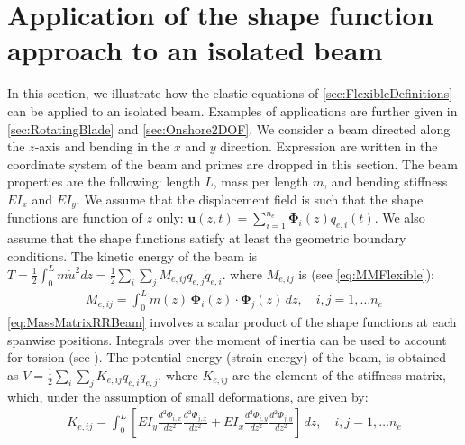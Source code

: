 \documentclass[wes, manuscript]{copernicus}
\renewcommand{\v}[1]{\boldsymbol{#1}}
\begin{document}
\section{Application of the shape function approach to an isolated beam}
\label{sec:ShapeFunctionApproachBeam}
In this section, we illustrate how the elastic equations of \autoref{sec:FlexibleDefinitions} can be applied to an isolated beam. 
Examples of applications are further given in \autoref{sec:RotatingBlade} and \autoref{sec:Onshore2DOF}.
We consider a beam directed along the $z$-axis and bending in the $x$ and $y$ direction. Expression are written in the coordinate system of the beam and primes are dropped in this section.
The beam properties are the following: length $L$, mass per length $m$, and bending stiffness $EI_x$ and $EI_y$.
We assume that the displacement field is such that the shape functions are function of $z$ only:
  $  \v{u}(z,t) = \sum_{i=1}^{n_e} \v{\Phi}_i(z) q_{e,i}(t)$.
We also assume that the shape functions satisfy at least the geometric boundary conditions. 
% 
The kinetic energy of the beam is $T= \frac{1}{2}\int_0^L m \dot{u}^2 dz=\frac{1}{2}\sum_i\sum_j M_{e,ij} \dot{q}_{e,j}\dot{q}_{e,i}$.
where $M_{e,ij}$ is (see \autoref{eq:MMFlexible}):
\begin{align}
  M_{e,ij} = \int_0^L m(z)\, \v{\Phi}_i(z)\cdot \v{\Phi}_j(z)\,dz 
      ,\quad i,j=1,\ldots n_e
      \label{eq:MassMatrixRRBeam}
\end{align}
\autoref{eq:MassMatrixRRBeam} involves a scalar product of the shape functions at each spanwise positions. Integrals over the moment of inertia can be used to account for torsion (see \cite{branlard:2019flex}).
The potential energy (strain energy) of the beam, is obtained as $V=\frac{1}{2} \sum_i \sum_j K_{e,ij}q_{e,i} q_{e,j}$, where $K_{e,ij}$ are the element of the stiffness matrix, which, under the assumption of small deformations, are given by:
\begin{align}
    K_{e,ij} = \int_{0}^L \left[EI_y \frac{d^2 \Phi_{i,x}}{dz^2} \frac{d^2 \Phi_{j,x}}{dz^2} + EI_x \frac{d^2 \Phi_{i,y}}{dz^2} \frac{d^2 \Phi_{j,y}}{dz^2}\right] \, dz
      ,\quad i,j=1,\ldots n_e
      \label{eq:stiffnessMatrixRRBeam}
\end{align}
\end{document}
